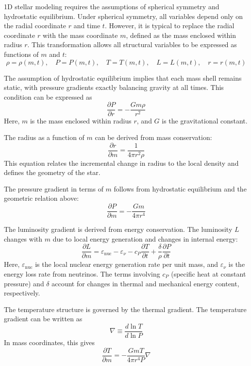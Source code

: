 1D stellar modeling requires the assumptions of spherical symmetry and hydrostatic equilibrium.  
Under spherical symmetry, all variables depend only on the radial coordinate $r$ and time $t$.  
However, it is typical to replace the radial coordinate $r$ with the mass coordinate $m$, defined as the mass enclosed within radius $r$.  
This transformation allows all structural variables to be expressed as functions of $m$ and $t$:  
\[
\rho = \rho(m,t), \quad P = P(m,t), \quad T = T(m,t), \quad L = L(m,t), \quad r = r(m,t)
\]

The assumption of hydrostatic equilibrium implies that each mass shell remains static, with pressure gradients exactly balancing gravity at all times.  
This condition can be expressed as  
\[
\frac{\partial P}{\partial r} = -\frac{G m \rho}{r^2}
\]
Here, $m$ is the mass enclosed within radius $r$, and $G$ is the gravitational constant.  

The radius as a function of $m$ can be derived from mass conservation:  
\[
\frac{\partial r}{\partial m} = \frac{1}{4\pi r^2 \rho}
\]
This equation relates the incremental change in radius to the local density and defines the geometry of the star.

The pressure gradient in terms of $m$ follows from hydrostatic equilibrium and the geometric relation above:  
\begin{equation}\label{eq:dP_dm}
\frac{\partial P}{\partial m} = -\frac{G m}{4\pi r^4}
\end{equation}

The luminosity gradient is derived from energy conservation.  
The luminosity $L$ changes with $m$ due to local energy generation and changes in internal energy:  
\begin{equation}
\frac{\partial L}{\partial m} = \varepsilon_{\mathrm{nuc}} - \varepsilon_\nu - c_P \frac{\partial T}{\partial t} + \frac{\delta}{\rho}\frac{\partial P}{\partial t}
\end{equation}
Here, $\varepsilon_{\mathrm{nuc}}$ is the local nuclear energy generation rate per unit mass, and $\varepsilon_\nu$ is the energy loss rate from neutrinos.  
The terms involving $c_P$ (specific heat at constant pressure) and $\delta$ account for changes in thermal and mechanical energy content, respectively.

The temperature structure is governed by the thermal gradient.  
The temperature gradient can be written as  
\[
\nabla \equiv \frac{d \ln T}{d \ln P}
\]
In mass coordinates, this gives  
\begin{equation}\label{eq:dT_dm}
\frac{\partial T}{\partial m} = -\frac{G m T}{4\pi r^4 P} \nabla
\end{equation}

